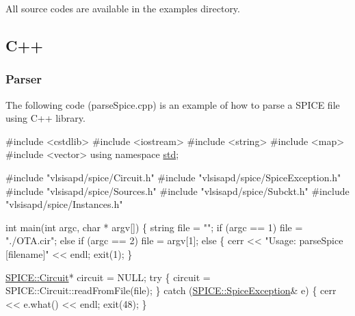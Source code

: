 All source codes are available in the {\ttfamily examples} directory.\hypertarget{spice_spiceC}{}\subsection{C++}\label{spice_spiceC}
\hypertarget{spice_spiceParseC}{}\subsubsection{Parser}\label{spice_spiceParseC}
The following code ({\ttfamily parse\+Spice.\+cpp}) is an example of how to parse a S\+P\+I\+CE file using C++ library. 
\begin{DoxyCodeInclude}
\textcolor{preprocessor}{#include <cstdlib>}
\textcolor{preprocessor}{#include <iostream>}
\textcolor{preprocessor}{#include <string>}
\textcolor{preprocessor}{#include <map>}
\textcolor{preprocessor}{#include <vector>}
\textcolor{keyword}{using namespace }\hyperlink{namespacestd}{std};

\textcolor{preprocessor}{#include "vlsisapd/spice/Circuit.h"}
\textcolor{preprocessor}{#include "vlsisapd/spice/SpiceException.h"}
\textcolor{preprocessor}{#include "vlsisapd/spice/Sources.h"}
\textcolor{preprocessor}{#include "vlsisapd/spice/Subckt.h"}
\textcolor{preprocessor}{#include "vlsisapd/spice/Instances.h"}

\textcolor{keywordtype}{int} main(\textcolor{keywordtype}{int} argc, \textcolor{keywordtype}{char} * argv[]) \{
    \textcolor{keywordtype}{string} file = \textcolor{stringliteral}{""};
    \textcolor{keywordflow}{if} (argc == 1)
        file = \textcolor{stringliteral}{"./OTA.cir"};
    \textcolor{keywordflow}{else} \textcolor{keywordflow}{if} (argc == 2)
        file = argv[1];
    \textcolor{keywordflow}{else} \{
        cerr << \textcolor{stringliteral}{"Usage: parseSpice [filename]"} << endl;
        exit(1);
    \}

    \hyperlink{class_s_p_i_c_e_1_1_circuit}{SPICE::Circuit}* circuit = NULL;
    \textcolor{keywordflow}{try} \{
        circuit = SPICE::Circuit::readFromFile(file);
    \} \textcolor{keywordflow}{catch} (\hyperlink{class_s_p_i_c_e_1_1_spice_exception}{SPICE::SpiceException}& e) \{
        cerr << e.what() << endl;
        exit(48);
    \}


\end{DoxyCodeInclude}
